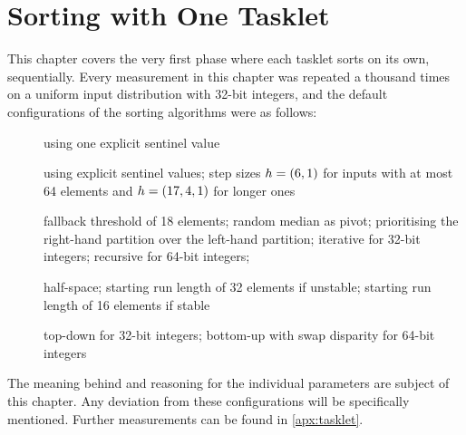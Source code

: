 \chapter{Sorting with One Tasklet}
\label{sec:tasklet}

This chapter covers the very first phase where each tasklet sorts on its own, \ie{} sequentially.
Every measurement in this chapter was repeated a thousand times on a uniform input distribution with 32-bit integers, and the default configurations of the sorting algorithms were as follows:
\begin{description}
	\item[\IS{}]
	using one explicit sentinel value

	\item[\ShS{}]
	using explicit sentinel values;
	step sizes \(h = (6, 1)\) for inputs with at most 64 elements and \(h = (17, 4, 1)\) for longer ones

	\item[\QS{}]
	fallback threshold of 18 elements;
	random median as pivot;
	prioritising the right-hand partition over the left-hand partition;
	iterative for 32-bit integers;
	recursive for 64-bit integers;

	\item[\MS{}]
	half-space;
	starting run length of 32 elements if unstable;
	starting run length of 16 elements if stable

	\item[\HS{}]
	top-down for 32-bit integers;
	bottom-up with swap disparity for 64-bit integers
\end{description}
The meaning behind and reasoning for the individual parameters are subject of this chapter.
Any deviation from these configurations will be specifically mentioned.
Further measurements can be found in \cref{apx:tasklet}.

\clearpage


\clearpage


\clearpage


\clearpage


\clearpage


\clearpage

